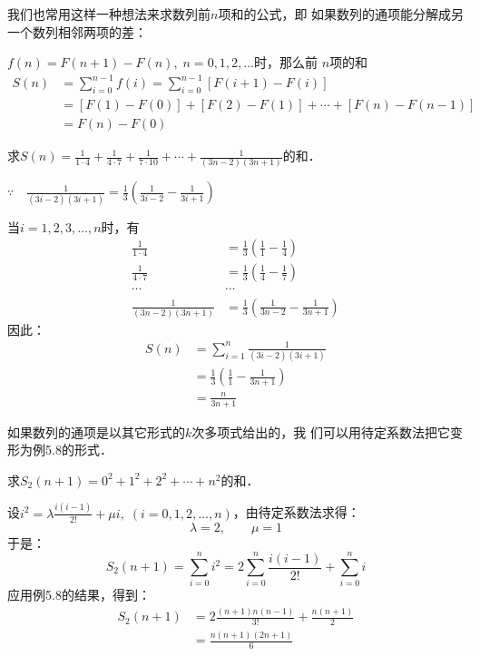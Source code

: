 我们也常用这样一种想法来求数列前$n$项和的公式，即
如果数列的通项能分解成另一个数列相邻两项的差：

$f(n)=F(n+1)-F(n),\; n=0,1,2,\ldots$时，那么前
$n$项的和
\[\begin{split}
   S(n)&= \sum^{n-1}_{i=0} f(i)= \sum^{n-1}_{i=0} [F(i+1)-F(i)]\\
   &=[F(1)-F(0)]+[F(2)-F(1)]+\cdots +[F(n)-F(n-1)]\\
   &=F(n)-F(0)
\end{split}\]


\begin{example}
    求$S(n)=\frac{1}{1\cdot 4}+\frac{1}{4\cdot 7}+\frac{1}{7\cdot 10}+\cdots +\frac{1}{(3n-2)(3n+1)}$的和．
\end{example}

\begin{solution}
$\because\quad \frac{1}{(3i-2)(3i+1)}=\frac{1}{3}\left(\frac{1}{3i-2}-\frac{1}{3i+1}\right)$

当$i=1,2,3,\ldots,n$时，有
\[\begin{split}
    \frac{1}{1\cdot 4}&=\frac{1}{3}\left(\frac{1}{1}-\frac{1}{4}\right)\\
    \frac{1}{4\cdot 7}&=\frac{1}{3}\left(\frac{1}{4}-\frac{1}{7}\right)\\
    \cdots &\cdots\\
    \frac{1}{(3n-2)(3n+1)}&=\frac{1}{3}\left(\frac{1}{3n-2}-\frac{1}{3n+1}\right)
\end{split}\]
因此：
\[\begin{split}
    S(n)&=\sum^n_{i=1}\frac{1}{(3i-2)(3i+1)}\\
    &=\frac{1}{3}\left(\frac{1}{1}-\frac{1}{3n+1}\right)\\
    &=\frac{n}{3n+1}
\end{split}\]
\end{solution}

如果数列的通项是以其它形式的$k$次多项式给出的，我
们可以用待定系数法把它变形为例5.8的形式．


\begin{example}
    求$S_2(n+1)=0^2+1^2+2^2+\cdots+n^2$的和．
\end{example}

\begin{solution}
    设$i^2=\lambda \frac{i(i-1)}{2!}+\mu i,\; (i=0,1,2,\ldots,n)$，由待定系数法求得：
\[\lambda=2,\qquad \mu=1\]
于是：
\[S_2(n+1)=\sum^n_{i=0}i^2=2\sum^n_{i=0}\frac{i(i-1)}{2!}+\sum^n_{i=0}i\]
应用例5.8的结果，得到：
\[\begin{split}
    S_2(n+1)&=2\frac{(n+1)n(n-1)}{3!}+\frac{n(n+1)}{2}\\
    &=\frac{n(n+1)(2n+1)}{6}
\end{split}\]
\end{solution}


